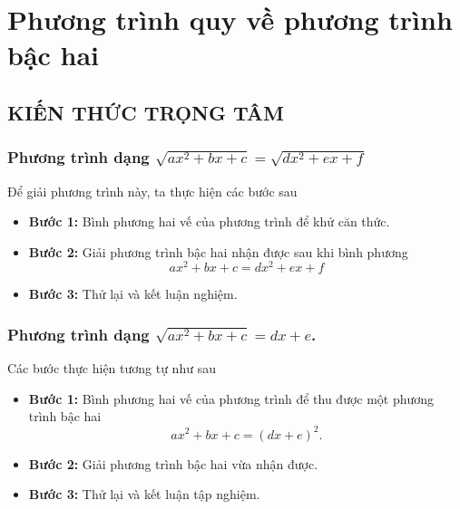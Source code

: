 \setcounter{dang}{0}%
\setcounter{section}{3}
\section{Phương trình quy về phương trình bậc hai}
\subsection{KIẾN THỨC TRỌNG TÂM}
\subsubsection{Phương trình dạng $\sqrt{ax^2+bx+c} = \sqrt{dx^2+ex+f}$}
\begin{boxdn}
		Để giải phương trình này, ta thực hiện các bước sau
\begin{itemize}
	\item \textbf{Bước 1:} Bình phương hai vế của phương trình để khử căn thức.
	\item \textbf{Bước 2:} Giải phương trình bậc hai nhận được sau khi bình phương $$ax^2+bx+c = dx^2+ex+f$$
	\item \textbf{Bước 3:} Thử lại và kết luận nghiệm.
\end{itemize}
\end{boxdn}
\subsubsection{Phương trình dạng $\sqrt{ax^2+bx+c} = dx+e$.}
\begin{boxdn}
		Các bước thực hiện tương tự như sau
\begin{itemize}
	\item \textbf{Bước 1:} Bình phương hai vế của phương trình để thu được một phương trình bậc hai $$ax^2+bx+c = (dx+e)^2.$$
	\item \textbf{Bước 2:} Giải phương trình bậc hai vừa nhận được.
	\item \textbf{Bước 3:} Thử lại và kết luận tập nghiệm.
\end{itemize}
\end{boxdn}
